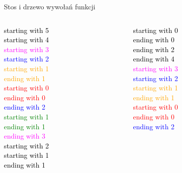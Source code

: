 \begin{frame}{Stos i drzewo wywołań funkcji}
    \centering
    \begin{columns}
        \begin{column}{0.25\textwidth}
            \textcolor{black}{starting with 5}\\
            \textcolor{black}{starting with 4}\\
            \textcolor{magenta}{starting with 3}\\
            \textcolor{blue}{starting with 2}\\
            \textcolor{orange}{starting with 1}\\
            \textcolor{orange}{ending with 1}\\
            \textcolor{red}{starting with 0}\\
            \textcolor{red}{ending with 0}\\
            \textcolor{blue}{ending with 2}\\
            \textcolor{green}{starting with 1}\\
            \textcolor{green}{ending with 1}\\
            \textcolor{magenta}{ending with 3}\\
            \textcolor{black}{starting with 2}\\
            \textcolor{black}{starting with 1}\\
            \textcolor{black}{ending with 1}\\
        \end{column}
        \begin{column}{0.25\textwidth}
            \textcolor{black}{starting with 0}\\
            \textcolor{black}{ending with 0}\\
            \textcolor{black}{ending with 2}\\
            \textcolor{black}{ending with 4}\\
            \textcolor{magenta}{starting with 3}\\
            \textcolor{blue}{starting with 2}\\
            \textcolor{orange}{starting with 1}\\
            \textcolor{orange}{ending with 1}\\
            \textcolor{red}{starting with 0}\\
            \textcolor{red}{ending with 0}\\
            \textcolor{blue}{ending with 2}\\

\end{column}
\end{columns}
\end{frame}
